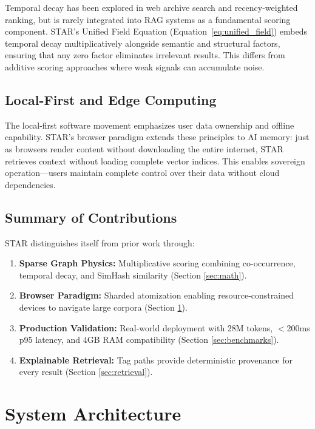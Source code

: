 \documentclass[11pt]{article}
\begin{document}
Temporal decay has been explored in web archive search \cite{kanhabua2008surviving} and recency-weighted ranking, but is rarely integrated into RAG systems as a fundamental scoring component. STAR's Unified Field Equation (Equation~\ref{eq:unified_field}) embeds temporal decay multiplicatively alongside semantic and structural factors, ensuring that any zero factor eliminates irrelevant results. This differs from additive scoring approaches where weak signals can accumulate noise.

\subsection{Local-First and Edge Computing}

The local-first software movement \cite{haque2023local} emphasizes user data ownership and offline capability. STAR's browser paradigm extends these principles to AI memory: just as browsers render content without downloading the entire internet, STAR retrieves context without loading complete vector indices. This enables sovereign operation---users maintain complete control over their data without cloud dependencies.

\subsection{Summary of Contributions}

STAR distinguishes itself from prior work through:
\begin{enumerate}
    \item \textbf{Sparse Graph Physics:} Multiplicative scoring combining co-occurrence, temporal decay, and SimHash similarity (Section \ref{sec:math}).
    \item \textbf{Browser Paradigm:} Sharded atomization enabling resource-constrained devices to navigate large corpora (Section \ref{sec:architecture}).
    \item \textbf{Production Validation:} Real-world deployment with 28M tokens, $<$200ms p95 latency, and 4GB RAM compatibility (Section \ref{sec:benchmarks}).
    \item \textbf{Explainable Retrieval:} Tag paths provide deterministic provenance for every result (Section \ref{sec:retrieval}).
\end{enumerate}

\section{System Architecture}
\label{sec:architecture}
\end{document}
